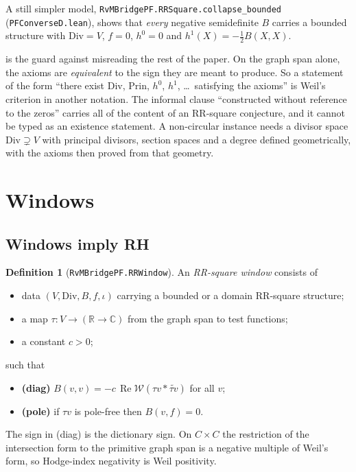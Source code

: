 \documentclass[11pt]{article}
\theoremstyle{definition}
\newtheorem{definition}[theorem]{Definition}
\newcommand{\lean}[1]{\texttt{#1}}
\newcommand{\re}{\operatorname{Re}}
\newcommand{\C}{\mathbb{C}}
\newcommand{\R}{\mathbb{R}}
\newcommand{\Div}{\mathrm{Div}}
\newcommand{\Prin}{\mathrm{Prin}}
\newcommand{\Weil}{\mathcal{W}}
\begin{document}
A still simpler model, \lean{RvMBridgePF.RRSquare.collapse\_bounded} (\lean{PFConverseD.lean}), shows that \emph{every} negative semidefinite $B$ carries a bounded structure with $\Div = V$, $f = 0$, $h^0 = 0$ and $h^1(X) = -\tfrac12 B(X,X)$.

 is the guard against misreading the rest of the paper. On the graph span alone, the axioms are \emph{equivalent} to the sign they are meant to produce. So a statement of the form ``there exist $\Div$, $\Prin$, $h^0$, $h^1$, \dots\ satisfying the axioms'' is Weil's criterion in another notation. The informal clause ``constructed without reference to the zeros'' carries all of the content of an RR-square conjecture, and it cannot be typed as an existence statement. A non-circular instance needs a divisor space $\Div \supsetneq V$ with principal divisors, section spaces and a degree defined geometrically, with the axioms then proved from that geometry.

\section{Windows}\label{sec:windows}

\subsection{Windows imply RH}

\begin{definition}[\lean{RvMBridgePF.RRWindow}]
An \emph{RR-square window} consists of
\begin{itemize}[leftmargin=*]
\item data $(V,\Div,B,f,\iota)$ carrying a bounded or a domain RR-square structure;
\item a map $\tau : V \to (\R\to\C)$ from the graph span to test functions;
\item a constant $c > 0$;
\end{itemize}
such that
\begin{itemize}[leftmargin=*]
\item \textbf{(diag)} $B(v,v) = -c\,\re\Weil(\tau v * \widetilde{\tau v})$ for all $v$;
\item \textbf{(pole)} if $\tau v$ is pole-free then $B(v,f) = 0$.
\end{itemize}
\end{definition}

The sign in (diag) is the dictionary sign. On $C\times C$ the restriction of the intersection form to the primitive graph span is a negative multiple of Weil's form, so Hodge-index negativity is Weil positivity.
\end{document}
